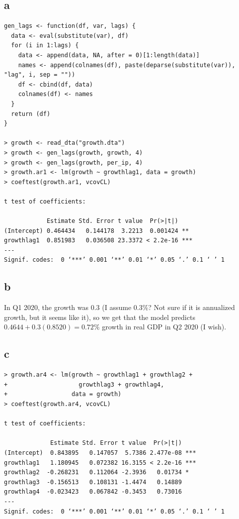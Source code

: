 \documentclass[12pt,letterpaper]{article}
\theoremstyle{definition}
\begin{document}
\subsection*{a}

\begin{Verbatim}[fontsize=\small]
gen_lags <- function(df, var, lags) {
  data <- eval(substitute(var), df)
  for (i in 1:lags) {
    data <- append(data, NA, after = 0)[1:length(data)]
    names <- append(colnames(df), paste(deparse(substitute(var)), "lag", i, sep = ""))
    df <- cbind(df, data)
    colnames(df) <- names
  }
  return (df)
}

> growth <- read_dta("growth.dta")
> growth <- gen_lags(growth, growth, 4)
> growth <- gen_lags(growth, per_ip, 4)
> growth.ar1 <- lm(growth ~ growthlag1, data = growth)
> coeftest(growth.ar1, vcovCL)

t test of coefficients:

            Estimate Std. Error t value  Pr(>|t|)
(Intercept) 0.464434   0.144178  3.2213  0.001424 **
growthlag1  0.851983   0.036508 23.3372 < 2.2e-16 ***
---
Signif. codes:  0 ‘***’ 0.001 ‘**’ 0.01 ‘*’ 0.05 ‘.’ 0.1 ‘ ’ 1
\end{Verbatim}

\subsection*{b}

In Q1 2020, the growth was 0.3 (I assume 0.3\%? Not sure if it is annualized growth, but it seems like it), so we get that the model predicts $0.4644 + 0.3(0.8520) = 0.72\%$ growth in real GDP in Q2 2020 (I wish).

\subsection*{c}

\begin{Verbatim}[fontsize=\small]
> growth.ar4 <- lm(growth ~ growthlag1 + growthlag2 +
+                    growthlag3 + growthlag4,
+                  data = growth)
> coeftest(growth.ar4, vcovCL)

t test of coefficients:

             Estimate Std. Error t value  Pr(>|t|)
(Intercept)  0.843895   0.147057  5.7386 2.477e-08 ***
growthlag1   1.180945   0.072382 16.3155 < 2.2e-16 ***
growthlag2  -0.268231   0.112064 -2.3936   0.01734 *
growthlag3  -0.156513   0.108131 -1.4474   0.14889
growthlag4  -0.023423   0.067842 -0.3453   0.73016
---
Signif. codes:  0 ‘***’ 0.001 ‘**’ 0.01 ‘*’ 0.05 ‘.’ 0.1 ‘ ’ 1
\end{Verbatim}
\end{document}
